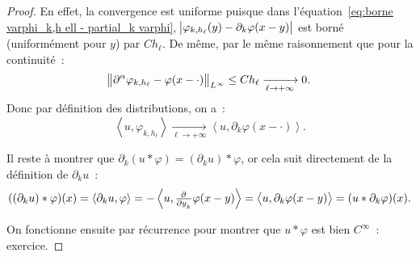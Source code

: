 \documentclass{report}
\newcommand{\scpr}[2]{\left\langle#1, #2\right\rangle}
\newcommand{\pinfty}{{+\infty}}
\theoremstyle{definition}
\theoremstyle{remark}
\begin{document}
\begin{proof}
En effet, la convergence est uniforme puisque dans l'équation~\eqref{eq:borne varphi_k,h ell - partial_k varphi}, $\abs {\varphi_{k,h_\ell}(y)-\partial_k\varphi(x-y)}$ est borné
(uniformément pour $y$) par $Ch_\ell$. De même, par le même raisonnement que pour la continuité~:
\[\norm {\partial^\alpha\varphi_{k,h_\ell} - \varphi(x-\cdot)}_{L^\infty} \leq Ch_\ell \xrightarrow[\ell \to \pinfty]{} 0.\]
Donc par définition des distributions, on a~:
\[\scpr u{\varphi_{k,h_\ell}} \xrightarrow[\ell \to \pinfty]{} \scpr u{\partial_k\varphi(x-\cdot)}.\]

Il reste à montrer que $\partial_k(u*\varphi) = (\partial_ku) * \varphi$, or cela suit directement de la définition de $\partial_ku$~:
\[((\partial_ku)*\varphi)(x) = \scpr {\partial_ku}\varphi = -\scpr u{\pd{}{y_k}\varphi(x-y)} = \scpr u{\partial_k\varphi(x-y)} = (u * \partial_k\varphi)(x).\]

On fonctionne ensuite par récurrence pour montrer que $u*\varphi$ est bien $C^\infty$~: exercice.
\end{proof}
\end{document}
